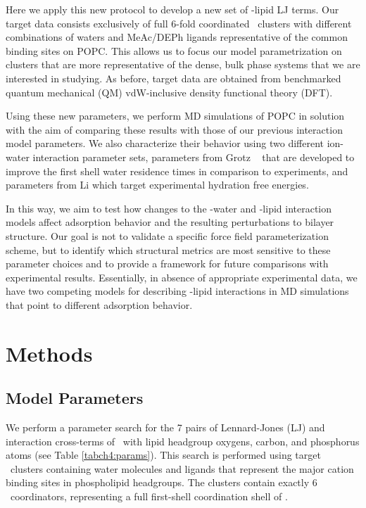 Here we apply this new protocol to develop a new set of \mg{}-lipid LJ
terms. Our target data consists exclusively of full 6-fold coordinated \mg~clusters with 
different combinations of waters and MeAc/DEPh ligands representative of the common binding sites on POPC.
This allows us to focus our model parametrization on clusters that are more representative of the dense, bulk phase systems that we are interested in studying. 
As before, target data are obtained from benchmarked quantum mechanical (QM) vdW-inclusive density functional theory (DFT).

Using these new parameters, we perform MD simulations of POPC in \mgcl{} solution with the aim of comparing these results
with those of our previous interaction model parameters. We also characterize their behavior using two different
ion-water interaction parameter sets, parameters from Grotz \etal~\cite{grotz:2021:optimized,micro} that are developed to
improve the first shell water residence times in comparison to experiments, and parameters from Li
\etal{}\cite{merzhfe} which target experimental hydration free energies.

In this way, we aim to test how changes to the \mg{}-water and \mg{}-lipid interaction models affect adsorption behavior and
the resulting perturbations to bilayer structure. Our goal is not to validate a specific force field parameterization scheme,
but to identify which structural metrics are most sensitive to these parameter choices and to provide a framework for future
comparisons with experimental results. 
Essentially, in absence of appropriate experimental data, we have two competing models for describing \mg{}-lipid interactions
in MD simulations that point to different adsorption behavior.

\section{Methods}
\subsection{\mg{} Model Parameters}

We perform a parameter search for the 7 pairs of Lennard-Jones (LJ) \sigmaij{} and \epsilonij{} interaction
cross-terms of \mg~with lipid headgroup oxygens, carbon, and phosphorus atoms (see Table \ref{tabch4:params}). 
This search is performed using target 
\mg~clusters containing water molecules and ligands that represent the major cation binding sites in phospholipid headgroups. 
The clusters contain exactly 6 \mg~coordinators, representing a full first-shell coordination shell of \mg{}.

